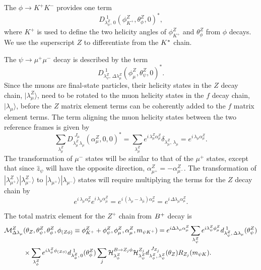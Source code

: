 The $\phi\to K^+K^-$ provides one term 
\begin{equation}
D^{\,\,1}_{\lambda^Z_{\phi},\,0}(\phi^Z_{K^+},\theta^Z_\phi,0)^*,
\end{equation}
where $K^+$ is used to define the two helicity angles of $\phi^Z_{K^+}$ and $\theta^Z_\phi$ from $\phi$ decays. We use the superscript $Z$ to differentiate from the ${K^*}$ chain. 

The $\psi\to\mu^+\mu^-$ decay is described by the term
\begin{equation}
D^{\,\,1}_{\lambda^{Z}_{\psi},\,\Delta\lambda^{Z}_\mu}(
\phi_{\mu}^{Z},\theta_{\psi}^{Z},0)^*.
\end{equation}
Since the muons are final-state particles,
their helicity states in the $Z$ decay chain, $|\lambda_\mu^{Z}\rangle$, 
need to be rotated to the muon helicity states in the $f$ decay chain, $|\lambda_\mu\rangle$, 
before the $Z$ matrix element terms can be coherently added to the $f$ matrix element terms. 
The term aligning the muon helicity states between the two reference frames is given by
\begin{equation}
   \sum\limits_{\lambda_\mu^{Z}} D^{\,\,J_\mu}_{\lambda_\mu^{Z}\,\lambda_\mu}(\alpha^{Z}_\mu,0,0)^* =
 \sum\limits_{\lambda_\mu^{Z}} e^{i\,\lambda_\mu^{Z}\alpha^{Z}_\mu} \delta_{\lambda_\mu^{Z},\,\lambda_\mu}
= e^{i\,\lambda_\mu\alpha^{Z}_\mu}.
\end{equation}
The transformation of $\mu^-$ states will be similar to that of the $\mu^+$ states, except that since $\hat{z}_\psi$ will have the opposite direction, 
$\alpha^{Z}_{{\mu^+}} = - \alpha^{Z}_{\mu^-}$. 
The transformation of $|\lambda_{\mu^+}^{Z}\rangle|\lambda_{\mu^-}^{Z}\rangle$ 
to $|\lambda_{\mu^+}\rangle|\lambda_{\mu^-}\rangle$ states will require multiplying the terms for the $Z$ decay chain by 
\begin{equation}
  e^{i\,\lambda_\mu\alpha^{Z}_\mu} e^{i\,\lambda_{\bar{\mu}}\alpha^{Z}_{\bar{\mu}}} 
=  e^{i\,(\lambda_\mu-\lambda_{\bar{\mu}})\alpha^{Z}_{\mu}} =  e^{i\,\Delta\lambda_\mu\alpha^{Z}_{\mu}}.
\label{SUPeq:mutran}
\end{equation}

The total matrix element for the $Z^+$ chain from ${{{B}^+}}$ decay is 
\begin{align}
{\mathcal{M}}^Z_{\Delta\lambda_\mu}&(\theta_{Z},\theta_\psi^{Z},\theta_\phi^Z,\phi_{(Z\phi)}\equiv\phi^Z_{K^+}+ \phi_\psi^Z,\phi_\mu^{Z},\alpha^{Z}_\mu,m_{\psi{\ensuremath{{K}^+}}})=e^{i\Delta\lambda_\mu\alpha^{Z}_{\mu}} \sum\limits_{\lambda_\psi^{Z}}e^{i \lambda^{Z}_{\psi} \phi_{\mu}^{Z}}d^{\,\,1}_{\lambda^{Z}_{\psi},\,\Delta\lambda_\mu}(\theta_{\psi}^{Z})  \notag\\
&\times \sum\limits_{\lambda^Z_{\phi}}e^{i\lambda^Z_{\phi} \phi_{(Z\phi)}} d^{\,\,1}_{\lambda^Z_{\phi},\,0}(\theta^Z_\phi) 
\sum\limits_{j}{\cal H}^{B\rightarrow Z_j \phi}_{\lambda_{\phi}^Z} {\cal H}_{\lambda_\psi^{Z}}^{Z_{j}} d^{\,\,J_{Z_j}}_{\lambda_{\phi}^Z,\,\lambda_\psi^{Z}}(\theta_{Z})R_{Z_j}(m_{\psi K}).
\end{align}


